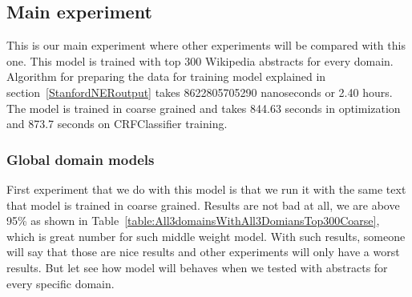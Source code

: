 \documentclass[thesis=M,english]{FITthesis}[2018/05/30]
\begin{document}
%

%	
\subsection{Main experiment}\label{MainExperiment}
	This is our main experiment where other experiments will be compared with this one. This model is trained with top 300 Wikipedia abstracts for every domain. Algorithm for preparing the data for training model explained in section~\ref{StanfordNERoutput}  takes 8622805705290 nanoseconds or 2.40 hours. The model is trained in coarse grained and takes 844.63 seconds in optimization and 873.7 seconds on CRFClassifier training.

\subsubsection{Global domain models}
	First experiment that we do with this model is that we run it with the same text that model is trained in coarse grained. Results are not bad at all, we are above 95\% as shown in Table~\ref{table:All3domainsWithAll3DomiansTop300Coarse}, which is great number for such middle weight model. With such results, someone will say that those are nice results and other experiments will only have a worst results. But let see how model will behaves when we tested with abstracts for every specific domain.
\end{document}
